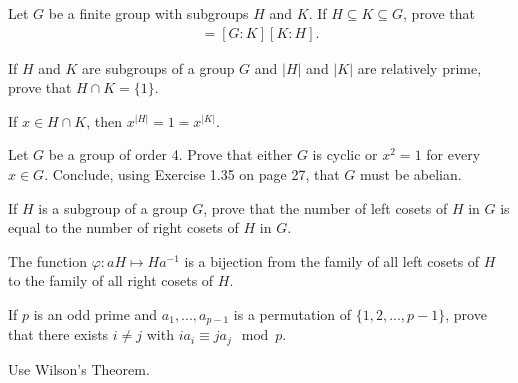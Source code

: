 \documentclass[12pt]{article}
\newenvironment{exercise}[2][Exercise]{\begin{trivlist}
\item[\hskip \labelsep {\bfseries #1}\hskip \labelsep {\bfseries #2.}]}
{\end{trivlist}}
\newenvironment{hint}[2][Hint]{\begin{trivlist}
    \item[\hskip \labelsep {\bfseries #1}\hskip \labelsep {\bfseries #2.}]}
    {\end{trivlist}}
\begin{document}
\begin{exercise}{1.41}
    Let $G$ be a finite group with subgroups $H$ and $K$. If $H\subseteq K\subseteq G$, prove that
    \begin{align*}
        [G:H] = [G:K][K:H].
    \end{align*}
\end{exercise}




\begin{exercise}{1.42}
    If $H$ and $K$ are subgroups of a group $G$ and $|H|$ and $|K|$ are relatively prime, prove that $H\cap K=\{1\}$.
    \begin{hint}{}
        If $x\in H\cap K$, then $x^{|H|} = 1 = x^{|K|}$.
    \end{hint}

\end{exercise}





\begin{exercise}{1.43}
    Let $G$ be a group of order 4. Prove that either $G$ is cyclic or $x^2=1$ for every $x\in G$. Conclude,
    using Exercise 1.35 on page 27, that $G$ must be abelian.
\end{exercise}


\begin{exercise}{1.44}
    If $H$ is a subgroup of a group $G$, prove that the number of left cosets of $H$ in $G$ is equal to the number of right
    cosets of $H$ in $G$.
    \begin{hint}{}
        The function $\varphi: aH \mapsto Ha^{-1}$ is a bijection from the family of all left cosets of $H$
        to the family of all right cosets of $H$.
    \end{hint}

\end{exercise}



\begin{exercise}{1.45}
    If $p$ is an odd prime and $a_1,...,a_{p-1}$ is a permutation of $\{1,2,...,p-1\}$, prove that
    there exists $i \neq j$ with $ia_i \equiv ja_j \mod p$.
    \begin{hint}{}
        Use Wilson's Theorem.
    \end{hint}
\end{exercise}
\end{document}
